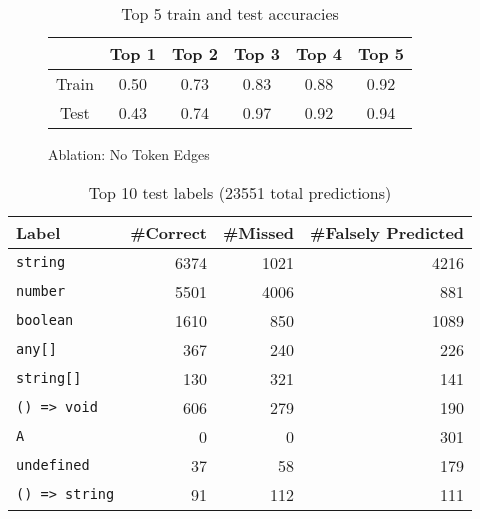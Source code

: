 \begin{table}
  \medskip

  \begin{subfigure}{\linewidth}
    \centering
    \begin{tabular}{c|ccccc}
      & \textbf{Top 1} & \textbf{Top 2} & \textbf{Top 3} & \textbf{Top 4} & \textbf{Top 5} \\
      \hline
      Train & 0.50 & 0.73 & 0.83 & 0.88 & 0.92 \\
      Test & 0.43 & 0.74 & 0.97 & 0.92 & 0.94
      \end{tabular}
      \caption{Ablation: No Token Edges}\label{tab:results:token}
  \end{subfigure}
  \caption{Top 5 train and test accuracies}
  \label{tab:results}
\end{table}

\begin{table}
  \centering
  \begin{tabular}{lrrr}
    \textbf{Label} & \textbf{\#Correct} & \textbf{\#Missed} & \textbf{\#Falsely Predicted} \\
    \hline
    \texttt{string} & 6374 & 1021 & 4216 \\
    \texttt{number} & 5501 & 4006 & 881 \\
    \texttt{boolean} & 1610 & 850 & 1089 \\
    \texttt{any[]} & 367 & 240 & 226 \\
    \texttt{string[]} & 130 & 321 & 141 \\
    \texttt{() => void} & 606 & 279 & 190 \\
    \texttt{A}  & 0 & 0 & 301 \\
    \texttt{undefined} & 37 & 58 & 179 \\
    \texttt{() => string} & 91 & 112 & 111
  \end{tabular}
  \caption{Top 10 test labels (23551 total predictions)}\label{tab:test-fps}
\end{table}
